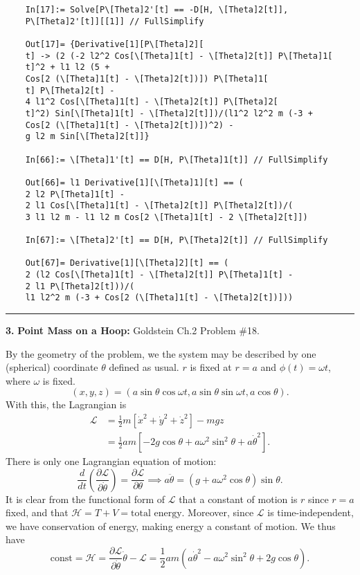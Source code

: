 \documentclass{article}
\theoremstyle{definition}
\newcommand{\p}{\partial}
\newcommand{\lag}{\mathcal{L}}
\newcommand{\ham}{\mathcal{H}}
\newcommand{\f}[2]{\frac{#1}{#2}}
\newcommand{\lp}{\left(}
\newcommand{\rp}{\right)}
\newcommand{\lb}{\left[}
\newcommand{\rb}{\right]}
\begin{document}
\begin{enumerate}[label=(\alph*)]
\begin{lstlisting}
	In[17]:= Solve[P\[Theta]2'[t] == -D[H, \[Theta]2[t]], 
	P\[Theta]2'[t]][[1]] // FullSimplify
	
	Out[17]= {Derivative[1][P\[Theta]2][
	t] -> (2 (-2 l2^2 Cos[\[Theta]1[t] - \[Theta]2[t]] P\[Theta]1[
	t]^2 + l1 l2 (5 + 
	Cos[2 (\[Theta]1[t] - \[Theta]2[t])]) P\[Theta]1[
	t] P\[Theta]2[t] - 
	4 l1^2 Cos[\[Theta]1[t] - \[Theta]2[t]] P\[Theta]2[
	t]^2) Sin[\[Theta]1[t] - \[Theta]2[t]])/(l1^2 l2^2 m (-3 + 
	Cos[2 (\[Theta]1[t] - \[Theta]2[t])])^2) - 
	g l2 m Sin[\[Theta]2[t]]}
	
	In[66]:= \[Theta]1'[t] == D[H, P\[Theta]1[t]] // FullSimplify
	
	Out[66]= l1 Derivative[1][\[Theta]1][t] == (
	2 l2 P\[Theta]1[t] - 
	2 l1 Cos[\[Theta]1[t] - \[Theta]2[t]] P\[Theta]2[t])/(
	3 l1 l2 m - l1 l2 m Cos[2 \[Theta]1[t] - 2 \[Theta]2[t]])
	
	In[67]:= \[Theta]2'[t] == D[H, P\[Theta]2[t]] // FullSimplify
	
	Out[67]= Derivative[1][\[Theta]2][t] == (
	2 (l2 Cos[\[Theta]1[t] - \[Theta]2[t]] P\[Theta]1[t] - 
	2 l1 P\[Theta]2[t]))/(
	l1 l2^2 m (-3 + Cos[2 (\[Theta]1[t] - \[Theta]2[t])]))
	\end{lstlisting}
\end{enumerate}




\hrule

$\,$\\



\noindent \textbf{3.} \textbf{Point Mass on a Hoop:} Goldstein Ch.2 Problem \#18. 

\noindent By the geometry of the problem, we the system may be described by one (spherical) coordinate $\theta$ defined as usual. $r$ is fixed at $r=a$ and $\phi(t) = \omega t$, where $\omega$ is fixed.
\begin{equation*}
(x,y,z) = (a\sin\theta \cos\omega t, a\sin\theta\sin\omega t, a\cos\theta).
\end{equation*}
With this, the Lagrangian is 
\begin{align*}
\lag 
&= \f{1}{2}m \lb \dot{x}^2 + \dot{y}^2 + \dot{z}^2\rb - mgz\\
&= \f{1}{2} am \lb -2g\cos\theta + a\omega^2\sin^2\theta  + a\dot{\theta}^2 \rb.
\end{align*}
There is only one Lagrangian equation of motion:
\begin{equation*}
\f{d}{dt}\lp \f{\p \lag}{\p \dot\theta} \rp = \f{\p \lag}{\p \theta} \implies a \ddot{\theta} =  \lp g + a\omega^2 \cos\theta \rp\sin\theta.
\end{equation*}
It is clear from the functional form of $\lag$ that a constant of motion is $r$ since $r=a$ fixed,  and that $\ham  = T+V = \text{total energy}$. Moreover, since $\lag$ is time-independent, we have conservation of energy, making energy a constant of motion. We thus have
\begin{equation*}
\text{const} = \ham = \f{\p \lag}{\p \dot\theta}\dot\theta - \lag = \frac{1}{2} a m \left(a \dot\theta^2-a \omega^2 \sin^2\theta+2 g \cos\theta\right).
\end{equation*}
\end{document}

